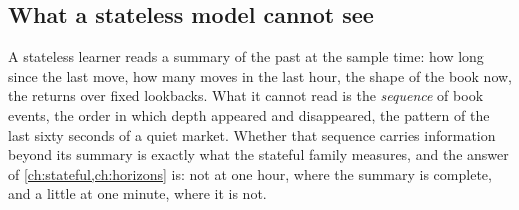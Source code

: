 \subsection{What a stateless model cannot see}
\label{sec:stateless:limits}

A stateless learner reads a summary of the past at the sample time: how long since the last
move, how many moves in the last hour, the shape of the book now, the returns over fixed
lookbacks.  What it cannot read is the \emph{sequence} of book events, the order in which
depth appeared and disappeared, the pattern of the last sixty seconds of a quiet market.
Whether that sequence carries information beyond its summary is exactly what the stateful
family measures, and the answer of \cref{ch:stateful,ch:horizons} is: not at one hour, where
the summary is complete, and a little at one minute, where it is not.
